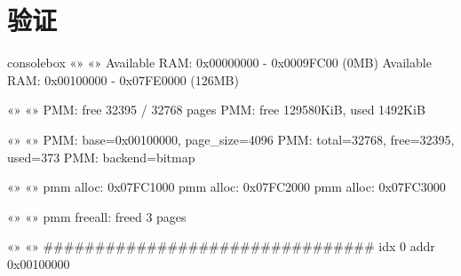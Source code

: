 \section{验证}

\begin{tcblisting}{consolebox}
«» «»
Available RAM: 0x00000000 - 0x0009FC00 (0MB)
Available RAM: 0x00100000 - 0x07FE0000 (126MB)

«» «»
PMM: free 32395 / 32768 pages
PMM: free 129580KiB, used 1492KiB

«» «»
PMM: base=0x00100000, page_size=4096
PMM: total=32768, free=32395, used=373
PMM: backend=bitmap

«» «»
pmm alloc: 0x07FC1000
pmm alloc: 0x07FC2000
pmm alloc: 0x07FC3000

«» «»
pmm freeall: freed 3 pages

«» «»
################################  idx   0 addr 0x00100000
\end{tcblisting}


